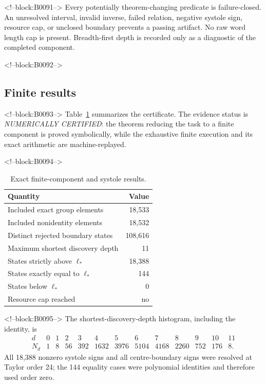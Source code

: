 \documentclass[11pt,a4paper]{article}
\theoremstyle{definition}
\newcommand{\length}{\ell}
\begin{document}
<!--block:B0091-->
Every potentially theorem-changing predicate is failure-closed.  An
unresolved interval, invalid inverse, failed relation, negative systole sign,
resource cap, or unclosed boundary prevents a passing artifact.  No raw word
length cap is present.  Breadth-first depth is recorded only as a diagnostic
of the completed component.

<!--block:B0092-->
\subsection{Finite results}

<!--block:B0093-->
Table~\ref{tab:results} summarizes the certificate.  The evidence status is
\emph{NUMERICALLY CERTIFIED}: the theorem reducing the task to a finite
component is proved symbolically, while the exhaustive finite execution and
its exact arithmetic are machine-replayed.

<!--block:B0094-->
\begin{table}[htbp]
\centering
\caption{Exact finite-component and systole results.}
\label{tab:results}
\begin{tabular}{@{}lr@{}}
\toprule
Quantity & Value\\
\midrule
Included exact group elements & 18,533\\
Included nonidentity elements & 18,532\\
Distinct rejected boundary states & 108,616\\
Maximum shortest discovery depth & 11\\
States strictly above \(\length_*\) & 18,388\\
States exactly equal to \(\length_*\) & 144\\
States below \(\length_*\) & 0\\
Resource cap reached & no\\
\bottomrule
\end{tabular}
\end{table}

<!--block:B0095-->
The shortest-discovery-depth histogram, including the identity, is
\[
\begin{array}{c|rrrrrrrrrrrr}
d&0&1&2&3&4&5&6&7&8&9&10&11\\\hline
N_d&1&8&56&392&1632&3976&5104&4168&2260&752&176&8.
\end{array}
\]
All 18,388 nonzero systole signs and all centre-boundary signs were resolved
at Taylor order 24; the 144 equality cases were polynomial identities and
therefore used order zero.
\end{document}
